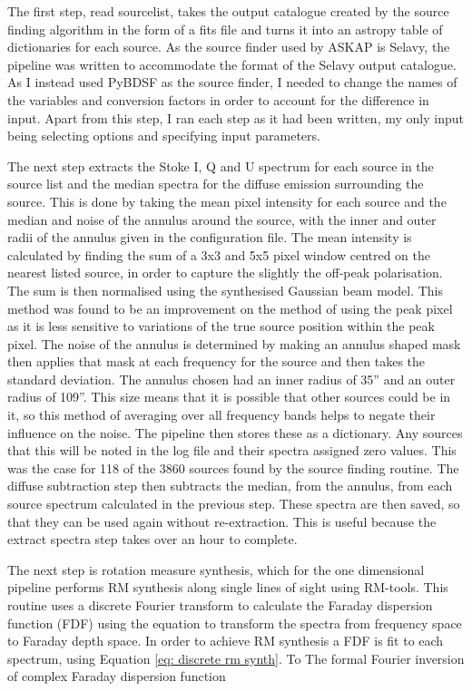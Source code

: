 The first step, read sourcelist, takes the output catalogue created by the source finding algorithm in the form of a fits file and turns it into an astropy table of dictionaries for each source. As the source finder used by ASKAP is Selavy, the pipeline was written to accommodate the format of the Selavy output catalogue. As I instead used PyBDSF as the source finder, I needed to change the names of the variables and conversion factors in order to account for the difference in input. Apart from this step, I ran each step as it had been written, my only input being selecting options and specifying input parameters.

The next step extracts the Stoke I, Q and U spectrum for each source in the source list and the median spectra for the diffuse emission surrounding the source. This is done by taking the mean pixel intensity for each source and the median and noise of the annulus around the source, with the inner and outer radii of the annulus given in the configuration file. The mean intensity is calculated by finding the sum of a 3x3 and 5x5 pixel window centred on the nearest listed source, in order to capture the slightly the off-peak polarisation. The sum is then normalised using the synthesised Gaussian beam model. This method was found to be an improvement on the method of using the peak pixel as it is less sensitive to variations of the true source position within the peak pixel. The noise of the annulus is determined by making an annulus shaped mask then applies that mask at each frequency for the source and then takes the standard deviation. The annulus chosen had an inner radius of 35'' and an outer radius of 109''. This size means that it is possible that other sources could be in it, so this method of averaging over all frequency bands helps to negate their influence on the noise. The pipeline then stores these as a dictionary. Any sources that this will be noted in the log file and their spectra assigned zero values. This was the case for 118 of the 3860 sources found by the source finding routine. The diffuse subtraction step then subtracts the median, from the annulus, from each source spectrum calculated in the previous step. These spectra are then saved, so that they can be used again without re-extraction. This is useful because the extract spectra step takes over an hour to complete.

The next step is rotation measure synthesis, which for the one dimensional pipeline performs RM synthesis along single lines of sight using RM-tools. 
This routine uses a discrete Fourier transform to calculate the Faraday dispersion function (FDF) using the equation to transform the spectra from frequency space to Faraday depth space. In order to achieve RM synthesis a FDF is fit to each spectrum, using Equation \ref{eq: discrete rm synth}. To The formal Fourier inversion of complex Faraday dispersion function

